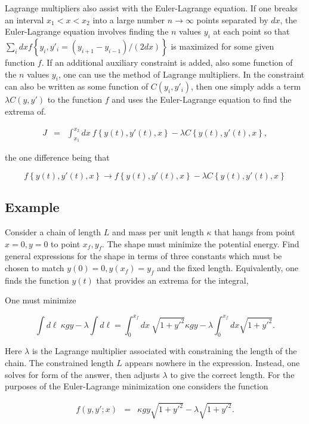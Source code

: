 \documentclass[%
oneside,                 %
final,                   %
10pt]{article}
\begin{document}
Lagrange multipliers also assist with the Euler-Lagrange equation. If
one breaks an interval $x_1<x<x_2$ into a large number
$n\rightarrow\infty$ points separated by $dx$, the Euler-Lagrange
equation involves finding the $n$ values $y_i$ at each point so that
$\sum_i dx f\left\{y_i,y'_i=(y_{i+1}-y_{i-1})/(2dx)\right\}$ is
maximized for some given function $f$. If an additional auxiliary
constraint is added, also some function of the $n$ values $y_i$, one
can use the method of Lagrange multipliers. In the constraint can also
be written as some function of $C(y_i,y'_i)$, then one simply adds a
term $\lambda C(y,y')$ to the function $f$ and uses the Euler-Lagrange
equation to find the extrema of.

\begin{eqnarray}
J&=&\int_{x_1}^{x_2}dx~f\left\{y(t),y'(t),x\right\}-\lambda C\left\{y(t),y'(t),x\right\},
\end{eqnarray}

the one difference being that

\begin{equation}
f\left\{y(t),y'(t),x\right\}\rightarrow f\left\{y(t),y'(t),x\right\}-\lambda C\left\{y(t),y'(t),x\right\}
\end{equation}

\subsection{Example}

Consider a chain of length $L$ and mass per unit length $\kappa$ that
hangs from point $x=0,y=0$ to point $x_f,y_f$. The shape must minimize
the potential energy. Find general expressions for the shape in terms
of three constants which must be chosen to match $y(0)=0, y(x_f)=y_f$
and the fixed length. Equivalently, one finds the function $y(t)$ that
provides an extrema for the integral,

One must minimize

\[
\int d\ell~\kappa gy-\lambda\int d\ell=
\int_0^{x_f} dx~\sqrt{1+y'^2}\kappa gy-\lambda \int_0^{x_f} dx\sqrt{1+y'^2}.
\]

Here $\lambda$ is the Lagrange multiplier associated with constraining
the length of the chain. The constrained length $L$ appears nowhere in
the expression. Instead, one solves for form of the answer, then
adjusts $\lambda$ to give the correct length. For the purposes of the
Euler-Lagrange minimization one considers the function

\begin{eqnarray}
f(y,y';x)&=&\kappa gy\sqrt{1+y'^2}-\lambda\sqrt{1+y'^2}.
\end{eqnarray}
\end{document}
